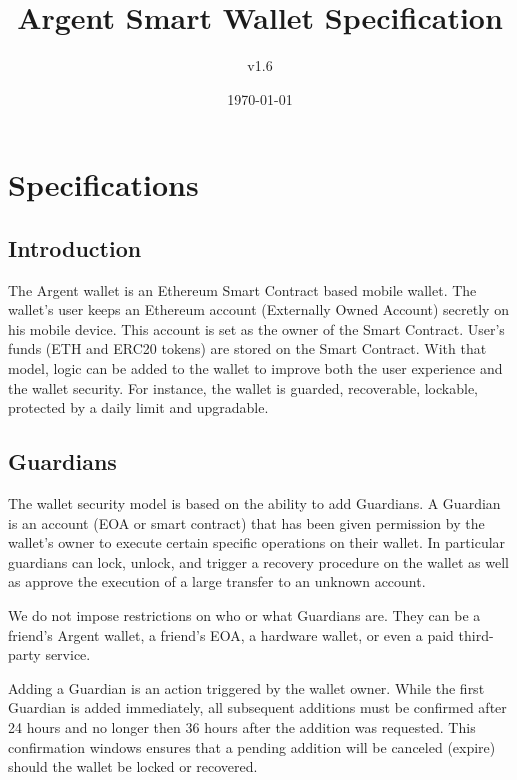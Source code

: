 \documentclass[12pt]{article}
\title{Argent Smart Wallet Specification}
\author{v1.6}
\date{\today}
\begin{document}
\maketitle

\section{Specifications}

\subsection{Introduction}

The Argent wallet is an Ethereum Smart Contract based mobile wallet. The wallet's user keeps an Ethereum account (Externally Owned Account) secretly on his mobile device. This account is set as the owner of the Smart Contract. User's funds (ETH and ERC20 tokens) are stored on the Smart Contract. With that model, logic can be added to the wallet to improve both the user experience and the wallet security. For instance, the wallet is guarded, recoverable, lockable, protected by a daily limit and upgradable.

\subsection{Guardians}

The wallet security model is based on the ability to add Guardians. A Guardian is an account (EOA or smart contract) that has been given permission by the wallet's owner to execute certain specific operations on their wallet. In particular guardians can lock, unlock, and trigger a recovery procedure on the wallet as well as approve the execution of a large transfer to an unknown account.

We do not impose restrictions on who or what Guardians are. They can be a friend's Argent wallet, a friend's EOA, a hardware wallet, or even a paid third-party service.

Adding a Guardian is an action triggered by the wallet owner. While the first Guardian is added immediately, all subsequent additions must be confirmed after 24 hours and no longer then 36 hours after the addition was requested. This confirmation windows ensures that a pending addition will be canceled (expire) should the wallet be locked or recovered.
\end{document}

